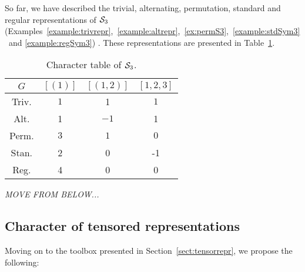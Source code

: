 \begin{example}
	So far, we have described the trivial, alternating, permutation, standard and regular representations of $\mathcal{S}_3$ (Examples~\ref{example:trivrepr},~\ref{example:altrepr},~\ref{ex:permS3},~\ref{example:stdSym3}~and \ref{example:regSym3}) . These representations are presented in Table~\ref{table:chartableSym3}.
	\begin{table}[hbt!]
	\centering
	\begin{tabular}{c | c c c }
		 $G$  & $[(1)]$ & $[(1,2)]$ & $[1,2,3]$ \\ \hline
		Triv. & $1$     & 1         & $1$       \\
		Alt.  & 1       & $-1$      & 1         \\
		Perm. & $3$     & $1$       & $0$       \\
		Stan. & 2       & 0         & -1        \\
		Reg.  & 4       & 0         & 0
	\end{tabular}
	\caption{Character table of $\mathcal{S}_3$.}
	\label{table:chartableSym3}
\end{table}
\end{example}

\begin{example}
	\textit{MOVE FROM BELOW...}
\end{example}

\subsection{Character of tensored representations}

Moving on to the toolbox presented in Section~\ref{sect:tensorrepr}, we propose the following:

